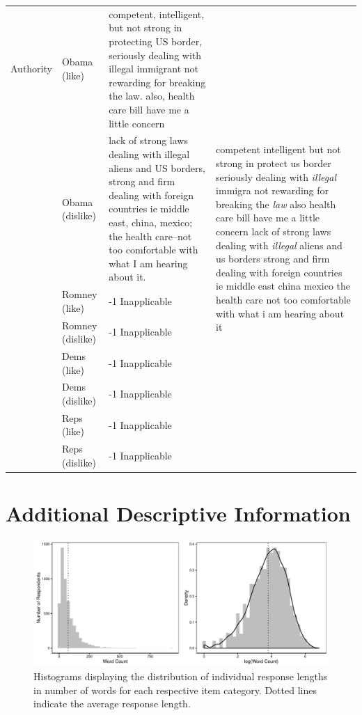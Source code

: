 \documentclass[12pt]{article}
\begin{document}
\begin{center}
\begin{longtable}{lp{1.5cm}p{5.5cm}p{5.5cm}}
	 Authority & Obama (like) & competent, intelligent, but not strong in protecting US border, seriously dealing with illegal immigrant not rewarding for breaking the law. also, health care bill have me a little concern & \multirow{8}{5.5cm}{competent intelligent but not strong in protect us border seriously dealing with \textit{illegal} immigra not rewarding for breaking the \textit{law} also health care bill have me a little concern lack of strong laws dealing with \textit{illegal} aliens and us borders strong and firm dealing with foreign countries ie middle east china mexico the health care not too comfortable with what i am hearing about it} \\
	 	 & Obama (dislike) & lack of strong laws dealing with illegal aliens and US borders, strong and firm dealing with foreign countries ie middle east, china, mexico; the health care--not too comfortable with what I am hearing about it. \\
	 	 & Romney (like) & -1 Inapplicable \\
	 	 & Romney (dislike) & -1 Inapplicable \\
	 	 & Dems (like) & -1 Inapplicable \\
	 	 & Dems (dislike) & -1 Inapplicable \\
	 	 & Reps (like) & -1 Inapplicable \\
	 	 & Reps (dislike) & -1 Inapplicable \\
\end{longtable}
\end{center}


\clearpage
\section{Additional Descriptive Information}\label{app:oview}
\renewcommand\thefigure{\thesection.\arabic{figure}}
\renewcommand\thetable{\thesection.\arabic{table}}
\setcounter{figure}{0}
\setcounter{table}{0}



\begin{figure}[h]\centering
\includegraphics[width=\textwidth]{../calc/fig/app_wc.pdf}
\caption{Histograms displaying the distribution of individual response lengths in number of words for each respective item category. Dotted lines indicate the average response length.}\label{fig:appB2num}
\end{figure}
\end{document}
